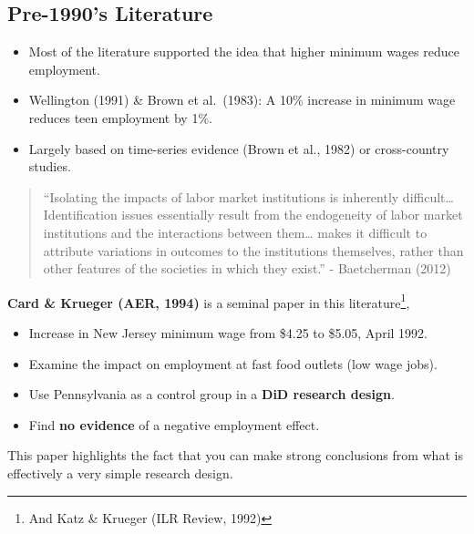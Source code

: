\documentclass[
  letterpaper,
  DIV=11,
  numbers=noendperiod]{scrreprt}
\providecommand{\tightlist}{%
  \setlength{\itemsep}{0pt}\setlength{\parskip}{0pt}}\usepackage{longtable,booktabs,array}
\theoremstyle{definition}
\theoremstyle{remark}
\begin{document}
\begin{enumerate}
  \subsection{Pre-1990's Literature}\label{pre-1990s-literature}

  \begin{itemize}
  \tightlist
  \item
    Most of the literature supported the idea that higher minimum wages
    reduce employment.
  \item
    Wellington (1991) \& Brown et al.~(1983): A 10\% increase in minimum
    wage reduces teen employment by 1\%.
  \item
    Largely based on time-series evidence (Brown et al., 1982) or
    cross-country studies.
  \end{itemize}

  \begin{quote}
  ``Isolating the impacts of labor market institutions is inherently
  difficult\ldots{} Identification issues essentially result from the
  endogeneity of labor market institutions and the interactions between
  them\ldots{} makes it difficult to attribute variations in outcomes to
  the institutions themselves, rather than other features of the
  societies in which they exist.'' - Baetcherman (2012)
  \end{quote}

  \textbf{Card \& Krueger (AER, 1994)} is a seminal paper in this
  literature\footnote{And Katz \& Krueger (ILR Review, 1992)},

  \begin{itemize}
  \tightlist
  \item
    Increase in New Jersey minimum wage from \$4.25 to \$5.05, April
    1992.
  \item
    Examine the impact on employment at fast food outlets (low wage
    jobs).
  \item
    Use Pennsylvania as a control group in a \textbf{DiD research
    design}.
  \item
    Find \textbf{no evidence} of a negative employment effect.
  \end{itemize}

  This paper highlights the fact that you can make strong conclusions
  from what is effectively a very simple research design.


\end{enumerate}
\end{document}
